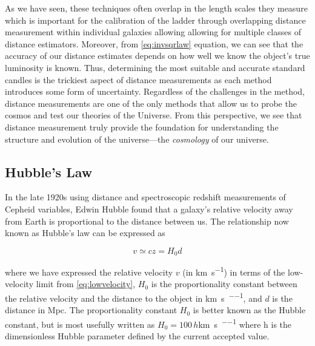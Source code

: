 As we have seen, these techniques often overlap in the length scales
they measure which is important for the calibration of the ladder
through overlapping distance measurement within individual galaxies
allowing allowing for multiple classes of distance estimators. Moreover,
from \cref{eq:invsqrlaw} equation, we can see that the
accuracy of our distance estimates depends on how well we know the
object's true luminosity is known. Thus, determining the most suitable
and accurate standard candles is the trickiest aspect of distance
measurements as each method introduces some form of uncertainty.
Regardless of the challenges in the method, distance measurements are
one of the only methods that allow us to probe the cosmos and test our
theories of the Universe. From this perspective, we see that distance
measurement truly provide the foundation for understanding the structure
and evolution of the universe---the \emph{cosmology} of our universe.

\subsection{Hubble's Law}\label{hubbles-law}

In the late 1920s using distance and spectroscopic redshift measurements
of Cepheid variables, Edwin Hubble found that a galaxy's relative
velocity away from Earth is proportional to the distance between us. The
relationship now known as Hubble's law can be expressed as

\begin{equation}v \simeq cz = H_0 d\label{eq:Hubble}\end{equation}

where we have expressed the relative velocity \(v\) (in \si{km\per\s})
in terms of the low-velocity limit from
\cref{eq:lowvelocity}, \(H_0\) is the proportionality
constant between the relative velocity and the distance to the object in
\si{\km\per\s\per\Mpc}, and \(d\) is the distance in \si{Mpc}. The
proportionality constant \(H_0\) is better known as the Hubble constant,
but is most usefully written as \(H_0= 100\, h\)\si{\km\per\s\per\Mpc}
where h is the dimensionless Hubble parameter defined by the current
accepted value.

